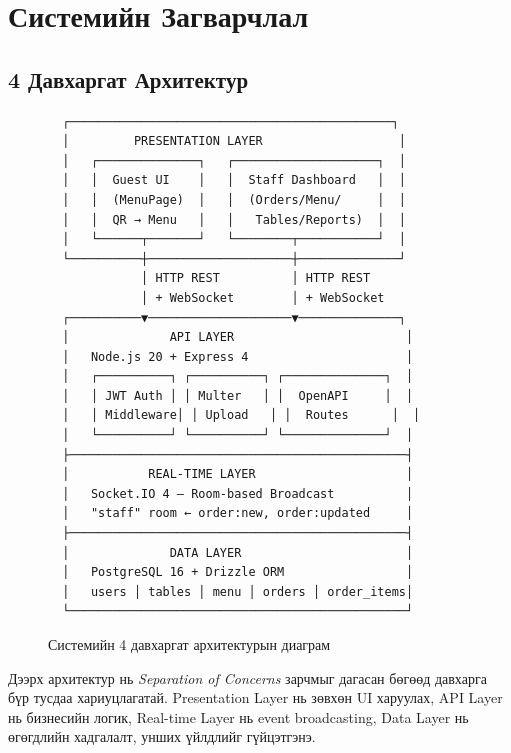 \documentclass[12pt,a4paper]{article}
\begin{document}
\section{Системийн Загварчлал}
\label{sec:design}

\subsection{4 Давхаргат Архитектур}

\begin{figure}[H]
\centering
\begin{tcolorbox}[colback=gray!5!white, colframe=gray!40!black, title=Системийн архитектурын диаграм]
\begin{verbatim}
  ┌─────────────────────────────────────────────┐
  │         PRESENTATION LAYER                   │
  │   ┌──────────────┐   ┌────────────────────┐  │
  │   │  Guest UI    │   │  Staff Dashboard   │  │
  │   │  (MenuPage)  │   │  (Orders/Menu/     │  │
  │   │  QR → Menu   │   │   Tables/Reports)  │  │
  │   └──────┬───────┘   └────────┬───────────┘  │
  └──────────┼────────────────────┼──────────────┘
             │ HTTP REST          │ HTTP REST
             │ + WebSocket        │ + WebSocket
  ┌──────────▼────────────────────▼──────────────┐
  │              API LAYER                        │
  │   Node.js 20 + Express 4                      │
  │   ┌──────────┐ ┌──────────┐ ┌──────────────┐  │
  │   │ JWT Auth │ │ Multer   │ │  OpenAPI     │  │
  │   │ Middleware│ │ Upload   │ │  Routes      │  │
  │   └──────────┘ └──────────┘ └──────────────┘  │
  ├───────────────────────────────────────────────┤
  │           REAL-TIME LAYER                     │
  │   Socket.IO 4 — Room-based Broadcast          │
  │   "staff" room ← order:new, order:updated     │
  ├───────────────────────────────────────────────┤
  │              DATA LAYER                       │
  │   PostgreSQL 16 + Drizzle ORM                 │
  │   users │ tables │ menu │ orders │ order_items│
  └───────────────────────────────────────────────┘
\end{verbatim}
\end{tcolorbox}
\caption{Системийн 4 давхаргат архитектурын диаграм}
\label{fig:arch}
\end{figure}

Дээрх архитектур нь \textit{Separation of Concerns} зарчмыг
дагасан бөгөөд давхарга бүр тусдаа хариуцлагатай. Presentation
Layer нь зөвхөн UI харуулах, API Layer нь бизнесийн логик,
Real-time Layer нь event broadcasting, Data Layer нь өгөгдлийн
хадгалалт, унших үйлдлийг гүйцэтгэнэ.
\end{document}
